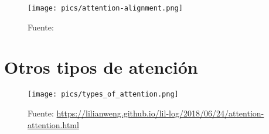 \begin{figure}[h]
  \centering
  \texttt{[image: pics/attention-alignment.png]}
  \caption{Fuente: \cite{cho2015describing}}
\end{figure}


\section{Otros tipos de atención}
\begin{figure}[h]
  \centering
  \texttt{[image: pics/types\_of\_attention.png]}
  \caption{Fuente: \url{https://lilianweng.github.io/lil-log/2018/06/24/attention-attention.html}}
\end{figure}
